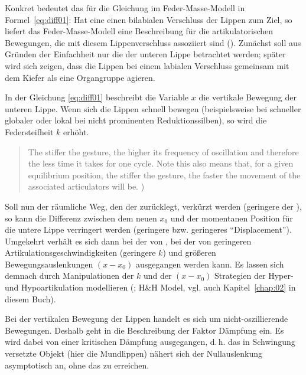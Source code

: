Konkret bedeutet das für die Gleichung im Feder-Masse-Modell in Formel~\ref{eq:diff01}: Hat eine  einen bilabialen Verschluss der Lippen zum Ziel, so liefert das Feder-Masse-Modell eine Beschreibung für die artikulatorischen Bewegungen, die mit diesem Lippenverschluss assoziiert sind (\citealt{Browman1986}). Zunächst soll aus Gründen der Einfachheit nur die  der unteren Lippe betrachtet werden; später wird sich zeigen, dass die Lippen bei einem labialen Verschluss gemeinsam mit dem Kiefer als eine Organgruppe agieren.

In der Gleichung \ref{eq:diff01} beschreibt die Variable $x$ die vertikale Bewegung der unteren Lippe. Wenn sich die Lippen schnell bewegen (beispielsweise bei schneller globaler  oder lokal bei nicht prominenten Reduktionssilben), so wird die Federsteifheit $k$ erhöht.

\begin{quotation}
	The stiffer the gesture, the higher its frequency of oscillation and therefore the less time it takes for one cycle. Note this also means that, for a given equilibrium position, the stiffer the gesture, the faster the movement of the associated articulators will be. \citep[][348]{Browman1991a})
\end{quotation}

\newpage 
Soll nun der räumliche Weg, den der  zurücklegt, verkürzt werden (geringere  der ), so kann die Differenz zwischen dem neuen  $x_{0}$ und der momentanen Position für die untere Lippe verringert werden (geringere  bzw. geringeres \enquote{Displacement}). Umgekehrt verhält es sich dann bei der  von , bei der von geringeren Artikulationsgeschwindigkeiten (geringere  $k$) und größeren Bewegungsauslenkungen $(x-x_{0})$ ausgegangen werden kann. Es lassen sich demnach durch Manipulationen der  $k$ und der  $(x-x_{0})$ Strategien der Hyper- und Hypoartikulation modellieren (\citealt{Lindblom1990}; H\&H Model, vgl. auch Kapitel~\ref{chap:02} in diesem Buch). 

Bei der vertikalen Bewegung der Lippen handelt es sich um nicht-oszillierende Bewegungen. Deshalb geht in die Beschreibung der Faktor Dämpfung ein. Es wird dabei von einer kritischen Dämpfung ausgegangen, d.\,h. das in Schwingung versetzte Objekt (hier die Mundlippen) nähert sich der Nullauslenkung asymptotisch an, ohne das  zu erreichen.

